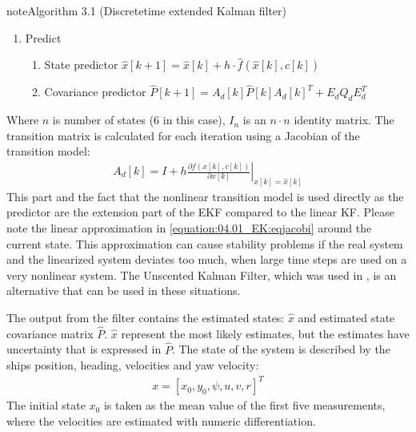 \documentclass[review]{elsarticle}
\begin{document}
\begin{sphinxadmonition}{note}{Algorithm 3.1 (Discrete\sphinxhyphen{}time extended Kalman filter)}
\begin{enumerate}
\begin{enumerate}
\item {} 
\sphinxAtStartPar
Predict
\begin{enumerate}
%
\item {} 
\sphinxAtStartPar
State predictor
\(\hat{x}[k+1] = \hat{x}[k] + h \cdot \hat{f}(\hat{x}[k], c[k])\)

\item {} 
\sphinxAtStartPar
Covariance predictor
\(\hat{P}[k+1] = A_d[k]  \hat{P}[k] A_d[k]^T + E_d Q_d E_d^T \)

\end{enumerate}

\end{enumerate}

\end{enumerate}
\end{sphinxadmonition}

\sphinxAtStartPar
Where \(n\) is number of states (6 in this case), \(I_n\) is an \(n \cdot n\) identity matrix.
The transition matrix is calculated for each iteration using a Jacobian of the transition model:
\begin{equation}\label{equation:04.01_EK:eqjacobi}
\begin{split}A_d[k] = I + h \left. \frac{\partial f \left(x[k],c[k] \right)}{\partial x[k]} \right|_{x[k]=\hat{x}[k]}\end{split}
\end{equation}
\sphinxAtStartPar
This part and the fact that the nonlinear transition model is used directly as the predictor are the extension part of the EKF compared to the linear KF. Please note the linear approximation in \autoref{equation:04.01_EK:eqjacobi} around the current state. This approximation can cause stability problems if the real system and the linearized system deviates too much, when large time steps are used on a very nonlinear system. The Unscented Kalman Filter, which was used in \cite{revestido_herrero_two-step_2012}, is an alternative that can be used in these situations.

\sphinxAtStartPar
The output from the filter contains the estimated states: \(\hat{x}\) and estimated state covariance matrix \(\hat{P}\). \(\hat{x}\) represent the most likely estimates, but the estimates have uncertainty that is expressed in \(\hat{P}\).
The state of the system is described by the ships position, heading, velocities and yaw velocity:
\begin{equation}\label{equation:04.01_EK:eqstates}
\begin{split}x = [x_0,y_0,\psi,u,v,r]^T\end{split}
\end{equation}
\sphinxAtStartPar
The initial state \(x_0\) is taken as the mean value of the first five measurements, where the velocities are estimated with numeric differentiation.
\end{document}
